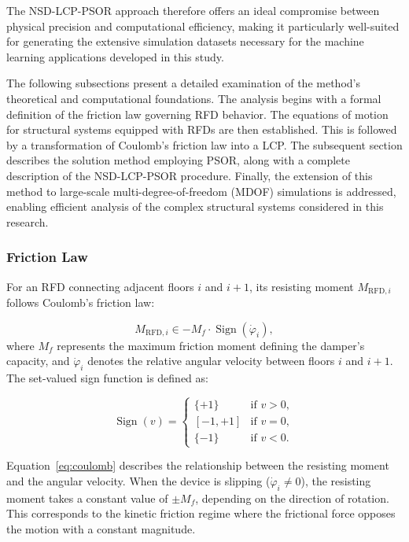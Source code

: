 \documentclass[preprint,12pt,authoryear]{elsarticle}
\newcommand{\Mf}{M_{\!f}}
\begin{document}
The NSD-LCP-PSOR approach therefore offers an ideal compromise between physical precision and computational efficiency, making it particularly well-suited for generating the extensive simulation datasets necessary for the machine learning applications developed in this study.

The following subsections present a detailed examination of the method's theoretical and computational foundations. The analysis begins with a formal definition of the friction law governing RFD behavior. The equations of motion for structural systems equipped with RFDs are then established. This is followed by a transformation of Coulomb's friction law into a LCP. The subsequent section describes the solution method employing PSOR, along with a complete description of the NSD-LCP-PSOR procedure. Finally, the extension of this method to large-scale multi-degree-of-freedom (MDOF) simulations is addressed, enabling efficient analysis of the complex structural systems considered in this research.

\subsubsection{Friction Law}
\label{sec:theory:friction_law}

For an RFD connecting adjacent floors $i$ and $i+1$, its resisting moment $M_{\mathrm{RFD},i}$ follows Coulomb's friction law:

\begin{equation}
	M_{\mathrm{RFD},i} \in -\Mf \cdot \operatorname{Sign}\left(\dot{\varphi}_i\right),
	\label{eq:coulomb}
\end{equation}
where $\Mf$ represents the maximum friction moment defining the damper's capacity, and $\dot{\varphi}_i$ denotes the relative angular velocity between floors $i$ and $i+1$. The set-valued sign function is defined as:

\begin{equation}
	\operatorname{Sign}(v) =
	\begin{cases}
		\{+1\}    & \text{if } v > 0, \\
		[-1,+1]  & \text{if } v = 0, \\
		\{-1\}    & \text{if } v < 0.
	\end{cases}
	\label{eq:sign}
\end{equation}

Equation~\eqref{eq:coulomb} describes the relationship between the resisting moment and the angular velocity. When the device is slipping ($\dot{\varphi}_i \neq 0$), the resisting moment takes a constant value of $\pm\Mf$, depending on the direction of rotation. This corresponds to the kinetic friction regime where the frictional force opposes the motion with a constant magnitude.
\end{document}
